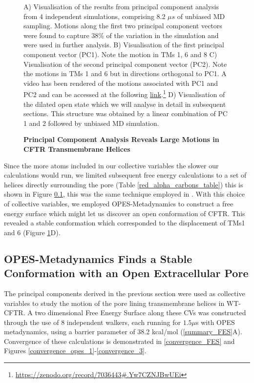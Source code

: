 \begin{figure}
	\caption[Principal Component Analysis Reveals Large Motions in CFTR Transmembrane Helices] {\textbf{Principal Component Analysis Reveals Large Motions in CFTR Transmembrane Helices}}{A) Visualisation of the results from principal component analysis from 4 independent simulations, comprising 8.2 $\mu s$ of unbiased MD sampling. Motions along the first two principal component vectors were found to capture 38\% of the variation in the simulation and were used in further analysis. B) Visualisation of the first principal component vector (PC1). Note the motion in TMs 1, 6 and 8 C) Visualisation of the second principal component vector (PC2). Note the motions in TMs 1 and 6 but in directions orthogonal to PC1. A video has been rendered of the motions associated with PC1 and PC2 and can be accessed at the following \href{https://zenodo.org/record/7036443#.Yw7CZNJBwUE}{link}.\footnote{\href{https://zenodo.org/record/7036443\#.Yw7CZNJBwUEi}{https://zenodo.org/record/7036443\#.Yw7CZNJBwUEi}} D) Visualisation of the dilated open state which we will analyse in detail in subsequent sections. This structure was obtained by a linear combination of PC 1 and 2 followed by unbiased MD simulation. } 
	\label{PCA_motions}
\end{figure}

Since the more atoms included in our collective variables the slower our calculations would run, we limited subsequent free energy calculations to a set of helices directly surrounding the pore (Table \ref{red_alpha_carbons_table}) this is shown in Figure \ref{}, this was the same technique employed in \cite{hoffmann2018}. With this choice of collective variables, we employed OPES-Metadynamics to construct a free energy surface which might let us discover an open conformation of CFTR. This revealed a stable conformation which corresponded to the displacement of TMs1 and 6 (Figure \ref{PCA_motions}D). 

\subsection{OPES-Metadynamics Finds a Stable Conformation with an Open Extracellular Pore}

The principal components derived in the previous section were used as collective variables to study the motion of the pore lining transmembrane helices in WT-CFTR. A two dimensional Free Energy Surface along these CVs was constructed through the use of 8 independent walkers, each running for $1.5\mu$s with OPES metadynamics, using a barrier parameter of 38.2 kcal/mol (\ref{summary_FES}A). Convergence of these calculations is demonstrated in \ref{convergence_FES} and Figures \ref{convergence_opes_1}-\ref{convergence_3}. 

